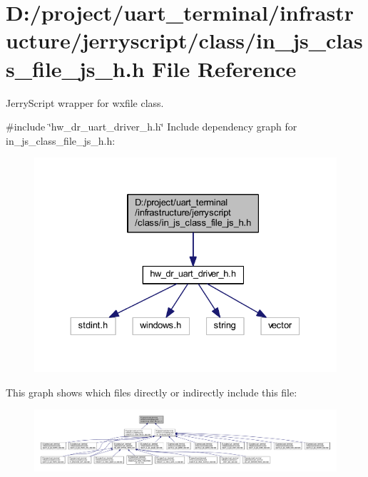 \section{D\+:/project/uart\+\_\+terminal/infrastructure/jerryscript/class/in\+\_\+js\+\_\+class\+\_\+file\+\_\+js\+\_\+h.h File Reference}
\label{in__js__class__file__js__h_8h}


Jerry\+Script wrapper for wxfile class.  


{\ttfamily \#include \char`\"{}hw\+\_\+dr\+\_\+uart\+\_\+driver\+\_\+h.\+h\char`\"{}}\newline
Include dependency graph for in\+\_\+js\+\_\+class\+\_\+file\+\_\+js\+\_\+h.\+h\+:
\nopagebreak
\begin{figure}[H]
\begin{center}
\leavevmode
\includegraphics[width=330pt]{in__js__class__file__js__h_8h__incl}
\end{center}
\end{figure}
This graph shows which files directly or indirectly include this file\+:
\nopagebreak
\begin{figure}[H]
\begin{center}
\leavevmode
\includegraphics[width=350pt]{in__js__class__file__js__h_8h__dep__incl}
\end{center}
\end{figure}
